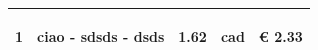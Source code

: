 \documentclass[a4paper]{article}
\begin{document}
\begin{tabular}{ | L{10mm} |  L{86mm} | L{12mm} | L{12mm} | L{16mm} | }
                              \vspace{2.5mm}
                              \begin{spacing}{0}
                           1
                              \end{spacing} &
                              \vspace{2.5mm}
                              \begin{spacing}{0}
                           ciao - sdsds - dsds
                              \end{spacing} &
                              \vspace{2.5mm}
                              \begin{spacing}{0}
                           1.62
                              \end{spacing} &
                              \vspace{2.5mm}
                              \begin{spacing}{0}
                           cad
                              \end{spacing} &
                              \vspace{2.5mm}
                              \begin{spacing}{0}
                                \euro\hfill 
                            2.33
                              \end{spacing} \\
                              \hline


\end{tabular}
\end{document}
